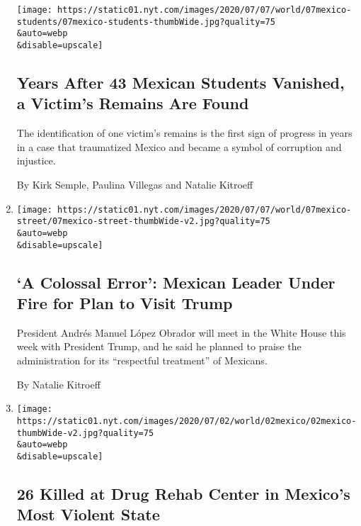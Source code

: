 \begin{enumerate}
  \texttt{[image: https://static01.nyt.com/images/2020/07/07/world/07mexico-students/07mexico-students-thumbWide.jpg?quality=75\\\&auto=webp\\\&disable=upscale]}

  \hypertarget{years-after-43-mexican-students-vanished-a-victims-remains-are-found}{%
  \subsection{Years After 43 Mexican Students Vanished, a Victim's
  Remains Are
  Found}\label{years-after-43-mexican-students-vanished-a-victims-remains-are-found}}

  The identification of one victim's remains is the first sign of
  progress in years in a case that traumatized Mexico and became a
  symbol of corruption and injustice.

  By Kirk Semple, Paulina Villegas and Natalie Kitroeff
\item
  \href{/2020/07/07/world/americas/amlo-trump-mexico-white-house.html}{}

  \texttt{[image: https://static01.nyt.com/images/2020/07/07/world/07mexico-street/07mexico-street-thumbWide-v2.jpg?quality=75\\\&auto=webp\\\&disable=upscale]}

  \hypertarget{a-colossal-error-mexican-leader-under-fire-for-plan-to-visit-trump}{%
  \subsection{`A Colossal Error': Mexican Leader Under Fire for Plan to
  Visit
  Trump}\label{a-colossal-error-mexican-leader-under-fire-for-plan-to-visit-trump}}

  President Andrés Manuel López Obrador will meet in the White House
  this week with President Trump, and he said he planned to praise the
  administration for its ``respectful treatment'' of Mexicans.

  By Natalie Kitroeff
\item
  \href{/2020/07/02/world/americas/mexico-shooting-drug-rehab.html}{}

  \texttt{[image: https://static01.nyt.com/images/2020/07/02/world/02mexico/02mexico-thumbWide-v2.jpg?quality=75\\\&auto=webp\\\&disable=upscale]}

  \hypertarget{26-killed-at-drug-rehab-center-in-mexicos-most-violent-state}{%
  \subsection{26 Killed at Drug Rehab Center in Mexico's Most Violent
  State}\label{26-killed-at-drug-rehab-center-in-mexicos-most-violent-state}}


\end{enumerate}
